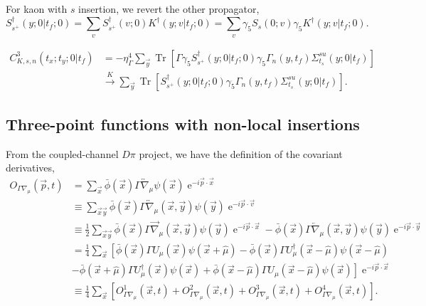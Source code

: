 \documentclass[10pt]{article}
\begin{document}
For kaon with $s$ insertion, we revert the other propagator,
\begin{equation}
    S_{s^+}^{\dagger}(y;0|t_f;0) = \sum_{v} S_{s^+}^{\dagger}(v;0) K^{\dagger}(y;v|t_f;0) = \sum_{v} \gamma_5 S_s(0;v) \gamma_5 K^{\dagger}(y;v|t_f;0).
\end{equation}


\begin{equation}
\begin{aligned}
    C_{K,s,n}^3(t_x;t_y;0|t_f) &= -\eta^4_{\Gamma} \sum_{\vec{y}} \operatorname{Tr} [\Gamma \gamma_5 S_{s^+}^{\dagger}(y;0|t_f;0) \gamma_5 \Gamma_n(y,t_f) \Sigma_{t_s}^{su}(y;0|t_f) ] \\
    &\xrightarrow{K} \sum_{\vec{y}} \operatorname{Tr} [S_{s^+}^{\dagger}(y;0|t_f;0) \gamma_5 \Gamma_n(y,t_f) \Sigma_{t_s}^{su}(y;0|t_f) ].
\label{eq:3pt}
\end{aligned}
\end{equation}



\subsection{Three-point functions with non-local insertions}
From the coupled-channel $D\pi$ project, we have the definition of the covariant derivatives,
\begin{equation}
\begin{aligned}
    O_{\Gamma \nabla_{\mu}}(\vec{p}, t) &= \sum_{\vec{x}} \bar{\phi}(\vec{x}) \Gamma \overleftrightarrow{\nabla}_{\mu} \psi(\vec{x}) \operatorname{e}^{-i\vec{p}\cdot\vec{x}} \\
    &\equiv \sum_{\vec{x} \vec{y}} \bar{\phi}(\vec{x}) \Gamma \overleftrightarrow{\nabla}_{\mu}(\vec{x}, \vec{y}) \psi(\vec{y}) \operatorname{e}^{-i\vec{p}\cdot\vec{v}} \\
    &\equiv \frac{1}{2} \sum_{\vec{x} \vec{y}} \bar{\phi}(\vec{x}) \Gamma \overrightarrow{\nabla}_{\mu}(\vec{x}, \vec{y}) \psi(\vec{y}) \operatorname{e}^{-i\vec{p}\cdot\vec{x}} - \bar{\phi}(\vec{x}) \Gamma \overleftarrow{\nabla}_{\mu}(\vec{x}, \vec{y}) \psi(\vec{y}) \operatorname{e}^{-i\vec{p}\cdot\vec{y}} \\
    &= \frac{1}{4} \sum_{\vec{x}} \left[ \bar{\phi}(\vec{x}) \Gamma U_{\mu}(\vec{x}) \psi(\vec{x}+\hat{\mu}) - \bar{\phi}(\vec{x}) \Gamma U_{\mu}^{\dagger}(\vec{x}-\hat{\mu}) \psi(\vec{x}-\hat{\mu}) \right. \\
    &\left. - \bar{\phi}(\vec{x}+\hat{\mu}) \Gamma U_{\mu}^{\dagger}(\vec{x})\psi(\vec{x}) + \bar{\phi}(\vec{x}-\hat{\mu}) \Gamma U_{\mu}(\vec{x}-\hat{\mu}) \psi(\vec{x}) \right] \operatorname{e}^{-i\vec{p}\cdot\vec{x}} \\
    &\equiv \frac{1}{4} \sum_{\vec{x}} \left[ O_{\Gamma \nabla_{\mu}}^1(\vec{x}, t) + O_{\Gamma \nabla_{\mu}}^2(\vec{x}, t) + O_{\Gamma \nabla_{\mu}}^3(\vec{x}, t) + O_{\Gamma \nabla_{\mu}}^4(\vec{x}, t) \right]. \\
\end{aligned}
\end{equation}
\end{document}
